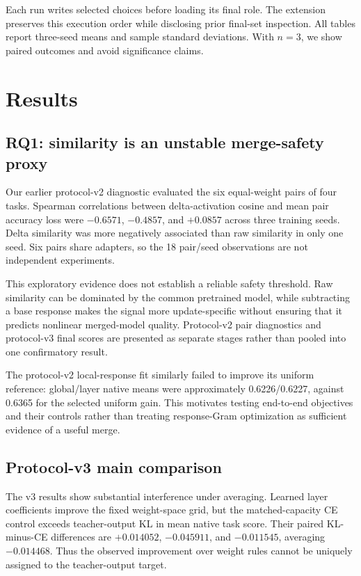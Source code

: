 \documentclass[11pt,a4paper]{article}
\begin{document}
Each run writes selected choices before loading its final role. The extension preserves this execution order while disclosing prior final-set inspection. All tables report three-seed means and sample standard deviations. With $n=3$, we show paired outcomes and avoid significance claims.

\section{Results}
\subsection{RQ1: similarity is an unstable merge-safety proxy}
Our earlier protocol-v2 diagnostic evaluated the six equal-weight pairs of four tasks. Spearman correlations between delta-activation cosine and mean pair accuracy loss were $-0.6571$, $-0.4857$, and $+0.0857$ across three training seeds. Delta similarity was more negatively associated than raw similarity in only one seed. Six pairs share adapters, so the 18 pair/seed observations are not independent experiments.

This exploratory evidence does not establish a reliable safety threshold. Raw similarity can be dominated by the common pretrained model, while subtracting a base response makes the signal more update-specific without ensuring that it predicts nonlinear merged-model quality. Protocol-v2 pair diagnostics and protocol-v3 final scores are presented as separate stages rather than pooled into one confirmatory result.

The protocol-v2 local-response fit similarly failed to improve its uniform reference: global/layer native means were approximately 0.6226/0.6227, against 0.6365 for the selected uniform gain. This motivates testing end-to-end objectives and their controls rather than treating response-Gram optimization as sufficient evidence of a useful merge.

\subsection{Protocol-v3 main comparison}

The v3 results show substantial interference under averaging. Learned layer coefficients improve the fixed weight-space grid, but the matched-capacity CE control exceeds teacher-output KL in mean native task score. Their paired KL-minus-CE differences are $+0.014052$, $-0.045911$, and $-0.011545$, averaging $-0.014468$. Thus the observed improvement over weight rules cannot be uniquely assigned to the teacher-output target.
\end{document}
